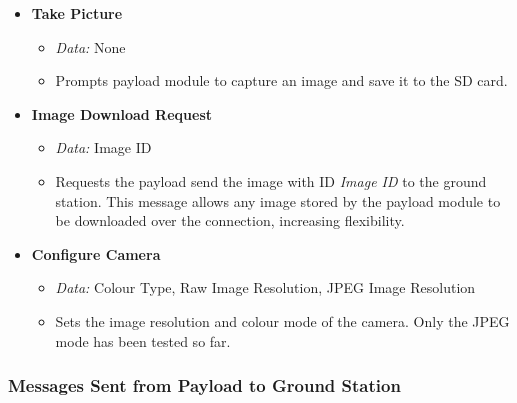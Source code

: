 \begin{itemize}
\item \textbf{Take Picture}
\begin{itemize}
\item \emph{Data:} None
\item Prompts payload module to capture an image and save it to the SD card.
\end{itemize}

\item \textbf{Image Download Request} 
\begin{itemize}

\item \emph{Data:} Image ID
\item Requests the payload send the image with ID \emph{Image ID} to the 
ground station. This message allows any image stored by the payload module 
to be downloaded over the connection, increasing flexibility. 
\end{itemize}

\item \textbf{Configure Camera}
\begin{itemize}
\item \emph{Data:} Colour Type, Raw Image Resolution, JPEG Image
Resolution
\item Sets the image resolution and colour mode of the camera. Only the 
JPEG mode has been tested so far.
\end{itemize}

\end{itemize}

\subsubsection*{Messages Sent from Payload to Ground Station}

